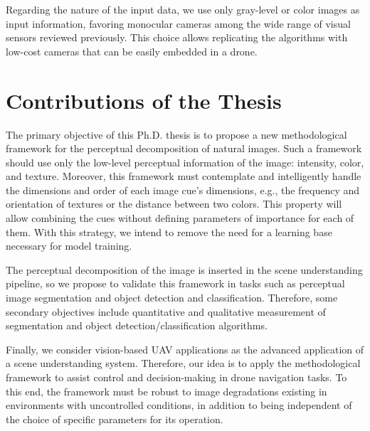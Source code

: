 Regarding the nature of the input data, we use only gray-level or color images as input information, favoring monocular cameras among the wide range of visual sensors reviewed previously. This choice allows replicating the algorithms with low-cost cameras that can be easily embedded in a drone.


\section*{Contributions of the Thesis}\label{sec:objectives_of_the_thesis}


The primary objective of this Ph.D. thesis is to propose a new methodological framework for the perceptual decomposition of natural images. Such a framework should use only the low-level perceptual information of the image: intensity, color, and texture. Moreover, this framework must contemplate and intelligently handle the dimensions and order of each image cue's dimensions, e.g., the frequency and orientation of textures or the distance between two colors. This property will allow combining the cues without defining parameters of importance for each of them. With this strategy, we intend to remove the need for a learning base necessary for model training.

The perceptual decomposition of the image is inserted in the scene understanding pipeline, so we propose to validate this framework in tasks such as perceptual image segmentation and object detection and classification. Therefore, some secondary objectives include quantitative and qualitative measurement of segmentation and object detection/classification algorithms.

Finally, we consider vision-based UAV applications as the advanced application of a scene understanding system. Therefore, our idea is to apply the methodological framework to assist control and decision-making in drone navigation tasks. To this end, the framework must be robust to image degradations existing in environments with uncontrolled conditions, in addition to being independent of the choice of specific parameters for its operation.

